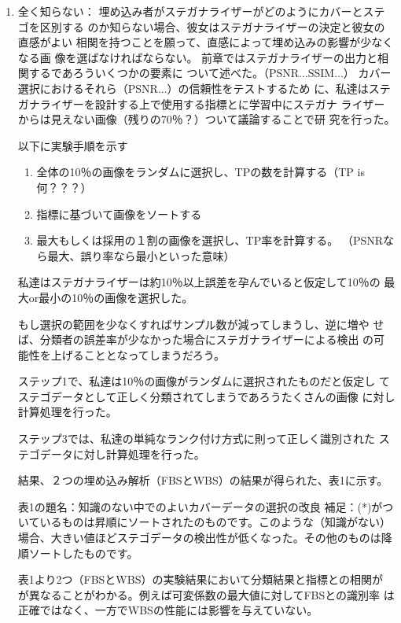 \documentclass[a4j,fleqn,10pt]{jsarticle}
\begin{document}
\begin{enumerate}
 \item 全く知らない：
       埋め込み者がステガナライザーがどのようにカバーとステゴを区別する
       のか知らない場合、彼女はステガナライザーの決定と彼女の直感がよい
       相関を持つことを願って、直感によって埋め込みの影響が少なくなる画
       像を選ばなければならない。
       前章ではステガナライザーの出力と相関するであろういくつかの要素に
       ついて述べた。（PSNR...SSIM...）
       カバー選択におけるそれら（PSNR...）の信頼性をテストするため
       に、私達はステガナライザーを設計する上で使用する指標とに学習中にステガナ
       ライザーからは見えない画像（残りの70％？）ついて議論することで研
       究を行った。

       以下に実験手順を示す

       \begin{enumerate}
        \item 全体の10％の画像をランダムに選択し、TPの数を計算する（TP
              is 何？？？）
        \item 指標に基づいて画像をソートする
        \item 最大もしくは採用の１割の画像を選択し、TP率を計算する。
              （PSNRなら最大、誤り率なら最小といった意味）
       \end{enumerate}

       私達はステガナライザーは約10％以上誤差を孕んでいると仮定して10％の
       最大or最小の10％の画像を選択した。

       もし選択の範囲を少なくすればサンプル数が減ってしまうし、逆に増や
       せば、分類者の誤差率が少なかった場合にステガナライザーによる検出
       の可能性を上げることとなってしまうだろう。

       ステップ1で、私達は10％の画像がランダムに選択されたものだと仮定し
       てステゴデータとして正しく分類されてしまうであろうたくさんの画像
       に対し計算処理を行った。
       
       ステップ3では、私達の単純なランク付け方式に則って正しく識別された
       ステゴデータに対し計算処理を行った。

       結果、２つの埋め込み解析（FBSとWBS）の結果が得られた、表1に示す。

       表1の題名：知識のない中でのよいカバーデータの選択の改良
       補足：(*)がついているものは昇順にソートされたのものです。このような（知識がない）場合、大きい値ほどステゴデータの検出性が低くなった。その他のものは降順ソートしたものです。

       表1より2つ（FBSとWBS）の実験結果において分類結果と指標との相関が
       が異なることがわかる。例えば可変係数の最大値に対してFBSとの識別率
       は正確ではなく、一方でWBSの性能には影響を与えていない。


\end{enumerate}
\end{document}
